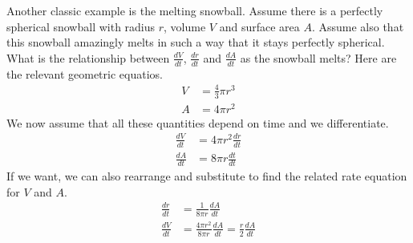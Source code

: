 \documentclass[fleqn]{report}
\begin{document}
\begin{example}
Another classic example is the melting snowball. Assume
there is a perfectly spherical snowball with radius $r$,
volume $V$ and surface area $A$. Assume also that this
snowball amazingly melts in such a way that it stays
perfectly spherical. What is the relationship between
$\frac{dV}{dt}$, $\frac{dr}{dt}$ and $\frac{dA}{dt}$ as the
snowball melts? Here are the relevant geometric equatios.
\begin{align*}
V & = \frac{4}{3} \pi r^3 \\
A & = 4 \pi r^2 
\end{align*}
We now assume that all these quantities depend on time and we
differentiate.
\begin{align*}
\frac{dV}{dt} & = 4\pi r^2 \frac{dr}{dt} \\
\frac{dA}{dt} & = 8 \pi r \frac{dt}{dt} 
\end{align*}
If we want, we can also rearrange and substitute to find the
related rate equation for $V$ and $A$.
\begin{align*}
\frac{dr}{dt} & = \frac{1}{8\pi r} \frac{dA}{dt} \\
\frac{dV}{dt} & = \frac{4\pi r^2}{8\pi r} \frac{dA}{dt} =
\frac{r}{2} \frac{dA}{dt} 
\end{align*}
\end{example}
\end{document}
